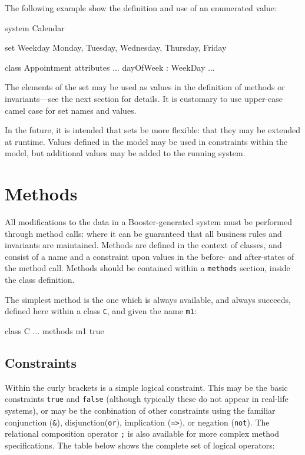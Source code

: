 The following example show the definition and use of an enumerated
value:

\begin{code}
system Calendar

set Weekday { Monday, Tuesday, Wednesday, Thursday, Friday}

class Appointment {
  attributes
    ...
    dayOfWeek : WeekDay
    ...
}
\end{code}

The elements of the set may be used as values in the definition of
methods or invariants---see the next section for details.  It is
customary to use upper-case camel case for set names and values.

In the future, it is intended that sets be more flexible: that they
may be extended at runtime.  Values defined in the model may be used
in constraints within the model, but additional values may be added to
the running system.

\section{Methods}

All modifications to the data in a Booster-generated system must be
performed through method calls: where it can be guaranteed that all
business rules and invariants are maintained.  Methods are defined in
the context of classes, and consist of a name and a constraint upon
values in the before- and after-states of the method call.  Methods
should be contained within a \verb|methods| section, inside the class
definition.

The simplest method is the one which is always available, and always
succeeds, defined here within a class \verb|C|, and given the name \verb|m1|:

\begin{code}
class C {
  ...
  methods
    m1 { true }
}    
\end{code}

\subsection{Constraints}
Within the curly brackets is a simple logical constraint.  This may be
the basic constraints \verb|true| and \verb|false| (although typically
these do not appear in real-life systems), or may be the conbination
of other constraints using the familiar conjunction (\verb|&|),
disjunction(\verb|or|), implication (\verb|=>|), or negation
(\verb|not|).  The relational composition operator \verb|;| is also
available for more complex method specifications.  The table below
shows the complete set of logical operators:

